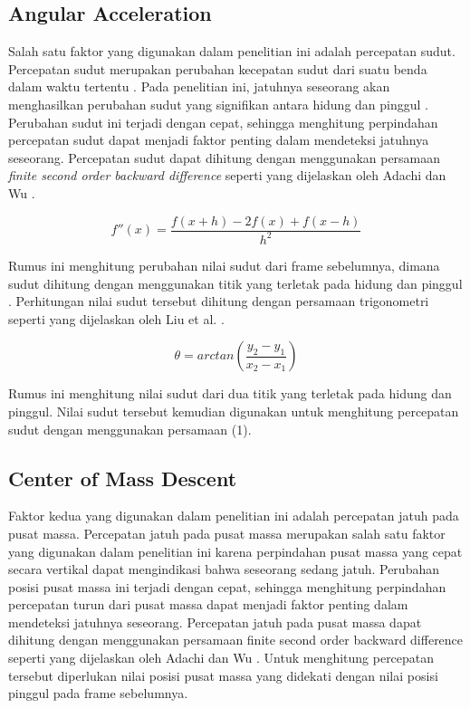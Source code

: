 \documentclass[conference]{IEEEtran}
\begin{document}
\subsection{Angular Acceleration}
Salah satu faktor yang digunakan dalam penelitian ini adalah percepatan sudut. Percepatan sudut merupakan perubahan kecepatan sudut dari suatu benda dalam waktu tertentu \cite{adachi2007fall}. Pada penelitian ini, jatuhnya seseorang akan menghasilkan perubahan sudut yang signifikan antara hidung dan pinggul \cite{liu2018fall}. Perubahan sudut ini terjadi dengan cepat, sehingga menghitung perpindahan percepatan sudut dapat menjadi faktor penting dalam mendeteksi jatuhnya seseorang. Percepatan sudut dapat dihitung dengan menggunakan persamaan \textit{finite second order backward difference} seperti yang dijelaskan oleh Adachi dan Wu \cite{adachi2007fall}.

\begin{equation}
f''(x)=\frac{f(x+h)-2f(x)+f(x-h)}{h^2}
\end{equation}

Rumus ini menghitung perubahan nilai sudut dari frame sebelumnya, dimana sudut dihitung dengan menggunakan titik yang terletak pada hidung dan pinggul \cite{han2019review}. Perhitungan nilai sudut tersebut dihitung dengan persamaan trigonometri seperti yang dijelaskan oleh Liu et al. \cite{liu2018fall}.

\begin{equation}
\theta=arctan(\frac{y_2-y_1}{x_2-x_1})
\end{equation}

Rumus ini menghitung nilai sudut dari dua titik yang terletak pada hidung dan pinggul. Nilai sudut tersebut kemudian digunakan untuk menghitung percepatan sudut dengan menggunakan persamaan (1).


\subsection{Center of Mass Descent}
Faktor kedua yang digunakan dalam penelitian ini adalah percepatan jatuh pada pusat massa. Percepatan jatuh pada pusat massa merupakan salah satu faktor yang digunakan dalam penelitian ini karena perpindahan pusat massa yang cepat secara vertikal dapat mengindikasi bahwa seseorang sedang jatuh. Perubahan posisi pusat massa ini terjadi dengan cepat, sehingga menghitung perpindahan percepatan turun dari pusat massa dapat menjadi faktor penting dalam mendeteksi jatuhnya seseorang. Percepatan jatuh pada pusat massa dapat dihitung dengan menggunakan persamaan finite second order backward difference seperti yang dijelaskan oleh Adachi dan Wu \cite{adachi2007fall}. Untuk menghitung percepatan tersebut diperlukan nilai posisi pusat massa yang didekati dengan nilai posisi pinggul pada frame sebelumnya.
\end{document}
